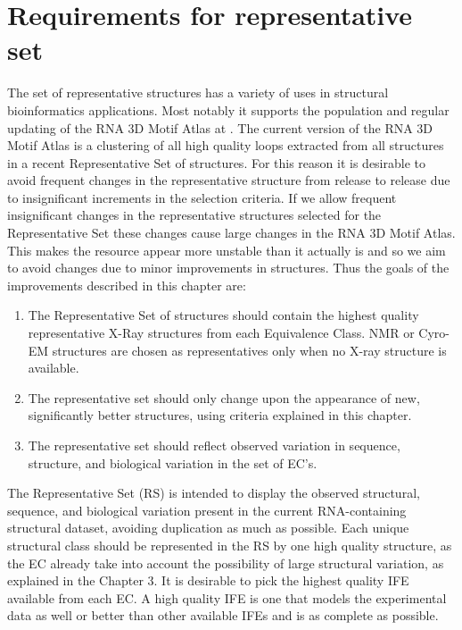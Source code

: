 \section{Requirements for representative set}

The set of representative structures has a variety of uses in structural
bioinformatics applications. Most notably it supports the population and regular
updating of the RNA 3D Motif Atlas at .
The current version of the RNA 3D Motif Atlas is a clustering of all high
quality loops extracted from all structures in a recent Representative Set of
structures. For this reason it is desirable to avoid frequent changes in the
representative structure from release to release due to insignificant increments
in the selection criteria. If we allow frequent insignificant changes in the
representative structures selected for the Representative Set these changes
cause large changes in the RNA 3D Motif Atlas. This makes the resource appear
more unstable than it actually is and so we aim to avoid changes due to minor
improvements in structures. Thus the goals of the improvements described in
this chapter are:

\begin{enumerate}
  \item The Representative Set of structures should contain the highest quality
    representative X-Ray structures from each Equivalence Class. NMR or Cyro-EM
    structures are chosen as representatives only when no X-ray structure is
    available.

  \item The representative set should only change upon the appearance of new,
    significantly better structures, using criteria explained in this chapter.

  \item The representative set should reflect observed variation in sequence,
    structure, and biological variation in the set of EC's.
\end{enumerate}

The Representative Set (RS) is intended to display the observed structural,
sequence, and biological variation present in the current RNA-containing
structural dataset, avoiding duplication as much as possible. Each unique
structural class should be represented in the RS by one high quality structure,
as the EC already take into account the possibility of large structural
variation, as explained in the Chapter 3. It is desirable to pick the highest
quality IFE available from each EC. A high quality IFE is one that models the
experimental data as well or better than other available IFEs and is as complete
as possible.

